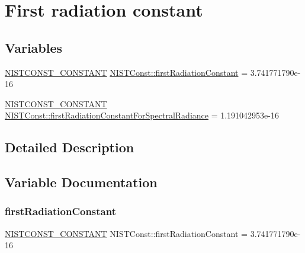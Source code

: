 \hypertarget{group___n_i_s_t_const-_first_radiation_constant}{}\section{First radiation constant}
\label{group___n_i_s_t_const-_first_radiation_constant}
\subsection*{Variables}
\begin{DoxyCompactItemize}
\item 
\mbox{\hyperlink{_n_i_s_t_const_8hpp_a2b0fc1d7452373f816175dd86ce26729}{N\+I\+S\+T\+C\+O\+N\+S\+T\+\_\+\+C\+O\+N\+S\+T\+A\+NT}} \mbox{\hyperlink{group___n_i_s_t_const-_first_radiation_constant_ga53183115e6a2d5cf5afc624f247f3698}{N\+I\+S\+T\+Const\+::first\+Radiation\+Constant}} = 3.\+741771790e-\/16
\item 
\mbox{\hyperlink{_n_i_s_t_const_8hpp_a2b0fc1d7452373f816175dd86ce26729}{N\+I\+S\+T\+C\+O\+N\+S\+T\+\_\+\+C\+O\+N\+S\+T\+A\+NT}} \mbox{\hyperlink{group___n_i_s_t_const-_first_radiation_constant_ga350d484e55bd7af5e00f59d5ed64d43b}{N\+I\+S\+T\+Const\+::first\+Radiation\+Constant\+For\+Spectral\+Radiance}} = 1.\+191042953e-\/16
\end{DoxyCompactItemize}


\subsection{Detailed Description}


\subsection{Variable Documentation}
\mbox{\label{group___n_i_s_t_const-_first_radiation_constant_ga53183115e6a2d5cf5afc624f247f3698}} 
\subsubsection{\texorpdfstring{first\+Radiation\+Constant}{firstRadiationConstant}}
{\footnotesize\ttfamily \mbox{\hyperlink{_n_i_s_t_const_8hpp_a2b0fc1d7452373f816175dd86ce26729}{N\+I\+S\+T\+C\+O\+N\+S\+T\+\_\+\+C\+O\+N\+S\+T\+A\+NT}} N\+I\+S\+T\+Const\+::first\+Radiation\+Constant = 3.\+741771790e-\/16}

